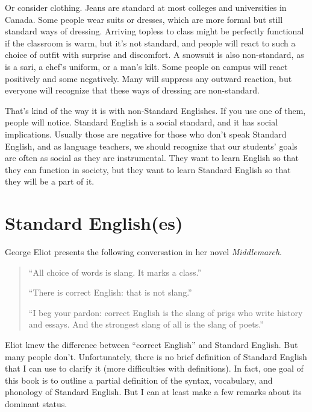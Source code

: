 Or consider clothing. Jeans are standard at most colleges and universities in Canada. Some people wear suits or dresses, which are more formal but still standard ways of dressing. Arriving topless to class might be perfectly functional if the classroom is warm, but it's not standard, and people will react to such a choice of outfit with surprise and discomfort. A snowsuit is also non-standard, as is a sari, a chef's uniform, or a man's kilt. Some people on campus will react positively and some negatively. Many will suppress any outward reaction, but everyone will recognize that these ways of dressing are non-standard.

That's kind of the way it is with non-Standard Englishes. If you use one of them, people will notice. Standard English is a social standard, and it has social implications. Usually those are negative for those who don't speak Standard English, and as language teachers, we should recognize that our students' goals are often as social as they are instrumental. They want to learn English so that they can function in society, but they want to learn Standard English so that they will be a part of it.


\section{Standard English(es)}\label{sec:standard}

George Eliot presents the following conversation in her novel \textit{Middlemarch}.

\begin{quote}
    ``All choice of words is slang. It marks a class.''

    ``There is correct English: that is not slang.''

    ``I beg your pardon: correct English is the slang of prigs who write history and essays. And the strongest slang of all is the slang of poets.''
\end{quote}


Eliot knew the difference between ``correct English'' and Standard English. But many people don't. Unfortunately, there is no brief definition of Standard English that I can use to clarify it (more difficulties with definitions). In fact, one goal of this book is to outline a partial definition of the syntax, vocabulary, and phonology of Standard English. But I can at least make a few remarks about its dominant status.

